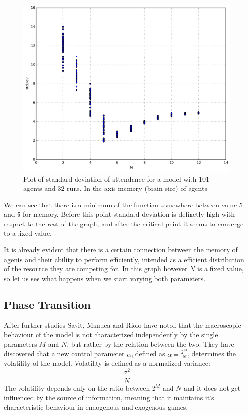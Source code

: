 \begin{figure}
\begin{center}
\includegraphics[scale=0.4]{images/minority/memory_to_stddev.pdf}
\caption{Plot of standard deviation of attendance for a model with 101 agents and 32 runs. In the axis memory (brain size) of agents}
\label{fig:memory to stddev}
\end{center}
\end{figure}

We can see that there is a minimum of the function somewhere between value $5$ and $6$ for memory.
Before this point standard deviation is definetly high with respect to the rest of the graph, and after the critical point it seems to converge to a fixed value.

It is already evident that there is a certain connection between the memory of agents and their ability to perform efficiently, intended as a efficient distribution of the resource they are competing for.
In this graph however $N$ is a fixed value, so let us see what happens when we start varying both parameters. 

\subsection{Phase Transition}
\label{subsec:phasetransition}

After further studies Savit, Manuca and Riolo \cite{savit1999adaptive} have noted that the macroscopic behaviour of the model is not characterized independently by the single parameters $M$ and $N$, but rather by the relation between the two.
They have discovered that a new control parameter $\alpha$, defined as $\alpha=\frac{2^M}{N}$, determines the volatility of the model.
Volatility is defined as a normalized variance:
\begin{displaymath}
\frac{\sigma^2}{N}
\end{displaymath}
The volatility depends only on the ratio between $2^M$ and $N$ and it does not get influenced by the source of information, meaning that it maintains it's characteristic behaviour in endogenous and exogenous games.

